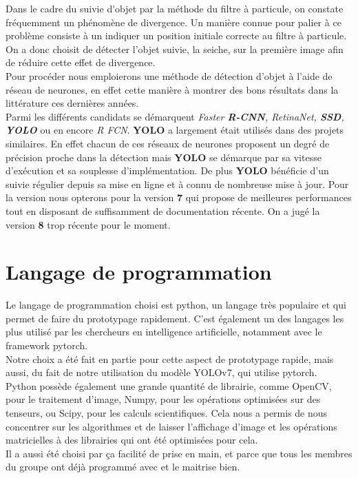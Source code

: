 Dans le cadre du suivie d'objet par la méthode du filtre à particule, on constate fréquemment un phénomène de divergence. Un manière connue pour palier à ce problème consiste à un indiquer un position initiale correcte au filtre à particule. On a donc choisit de détecter l'objet suivie, la seiche, sur la première image afin de réduire cette effet de divergence.\\
Pour procéder nous emploierons une méthode de détection d'objet à l'aide de réseau de neurones, en effet cette manière à montrer des bons résultats dans la littérature ces dernières années.\\
Parmi les différents candidats se démarquent \emph{Faster \textbf{R-CNN}, RetinaNet, \textbf{SSD}, \textbf{YOLO}} ou en encore \emph{R FCN}. 
\textbf{YOLO} a largement était utilisés dans des projets similaires. En effet chacun de ces réseaux de neurones proposent un degré de précision proche dans la détection mais \textbf{YOLO} se démarque par sa vitesse d'exécution et sa souplesse d'implémentation. De plus \textbf{YOLO} bénéficie d'un suivie régulier depuis sa mise en ligne et à connu de nombreuse mise à jour. Pour la version nous opterons pour la version \textbf{7} qui propose de meilleures performances tout en disposant de suffisamment de documentation récente. On a jugé la version \textbf{8} trop récente pour le moment.


\section{Langage de programmation}
Le langage de programmation choisi est python, un langage très populaire et qui permet de faire du prototypage rapidement. C'est également un des langages les plus utilisé par les chercheurs en intelligence artificielle, notamment avec le framework pytorch.\\
Notre choix a été fait en partie pour cette aspect de prototypage rapide, mais aussi, du fait de notre utilisation du modèle YOLOv7\cite{wang_yolov7_nodate}, qui utilise pytorch.\\
Python possède également une grande quantité de librairie, comme OpenCV, pour le traitement d'image, Numpy, pour les opérations optimisées sur des tenseurs, ou Scipy, pour les calculs scientifiques. Cela nous a permis de nous concentrer sur les algorithmes et de laisser l'affichage d'image et les opérations matricielles à des librairies qui ont été optimisées pour cela.\\
Il a aussi été choisi par ça facilité de prise en main, et parce que tous les membres du groupe ont déjà programmé avec et le maitrise bien.


\clearpage